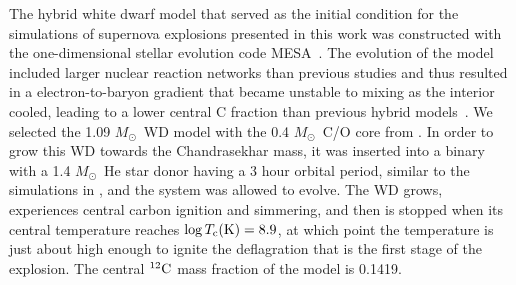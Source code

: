 \documentclass[preprint2]{aastex63}
\newcommand{\C}[1]{\ensuremath{{}^{#1}{\rm C}}}
\newcommand{\unitstyle}[1]{\ensuremath{\mathrm{#1}}}
\newcommand{\Kelvin}{\unitstyle{K}}
\newcommand{\Msun}{\ensuremath{M_\odot}}
\begin{document}
The hybrid white dwarf model that served as the initial condition
for the simulations of supernova explosions presented in this work
was constructed with the one-dimensional stellar evolution code
MESA~\citep{mesa1,mesa2,mesa3,mesa3e}. The evolution of the model 
included larger nuclear reaction networks than previous studies and 
thus resulted in a electron-to-baryon gradient that became unstable 
to mixing as the interior cooled, leading to a lower central C 
fraction than previous hybrid models~\citep{brooksetal2017}. We 
selected the 1.09 \Msun\ WD model 
with the 0.4 \Msun\ C/O core from \citep{brooksetal2017}.
In order to grow this WD towards the Chandrasekhar mass, it was inserted into 
a binary with a 1.4 \Msun\ He star donor having a 3 hour orbital period, similar to 
the simulations in \citet{brooksetal2016},
and the system was
allowed to evolve.  The WD grows, experiences central carbon ignition and 
simmering, and then is stopped when its central temperature reaches 
$\log T_{\rm c}(\Kelvin) = 8.9$, 
{\color{blue} 
at which point the 
temperature is just about high enough to ignite the deflagration that is 
the first stage of the explosion. The central \C{12} mass fraction 
of the model is 0.1419.}
\end{document}
